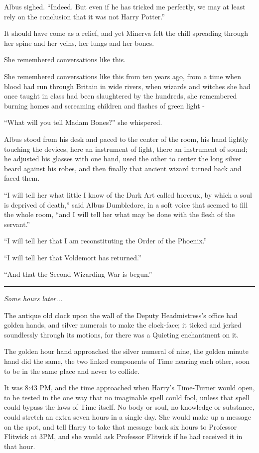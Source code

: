 Albus sighed. ``Indeed. But even if he has tricked me perfectly, we may at least rely on the conclusion that it was not Harry Potter.''

It should have come as a relief, and yet Minerva felt the chill spreading through her spine and her veins, her lungs and her bones.

She remembered conversations like this.

She remembered conversations like this from ten years ago, from a time when blood had run through Britain in wide rivers, when wizards and witches she had once taught in class had been slaughtered by the hundreds, she remembered burning homes and screaming children and flashes of green light -

``What will you tell Madam Bones?'' she whispered.

Albus stood from his desk and paced to the center of the room, his hand lightly touching the devices, here an instrument of light, there an instrument of sound; he adjusted his glasses with one hand, used the other to center the long silver beard against his robes, and then finally that ancient wizard turned back and faced them.

``I will tell her what little I know of the Dark Art called horcrux, by which a soul is deprived of death,'' said Albus Dumbledore, in a soft voice that seemed to fill the whole room, ``and I will tell her what may be done with the flesh of the servant.''

``I will tell her that I am reconstituting the Order of the Phoenix.''

``I will tell her that Voldemort has returned.''

``And that the Second Wizarding War is begun.''

\begin{center}\rule{3in}{0.4pt}\end{center}

\emph{Some hours later...}

The antique old clock upon the wall of the Deputy Headmistress's office had golden hands, and silver numerals to make the clock-face; it ticked and jerked soundlessly through its motions, for there was a Quieting enchantment on it.

The golden hour hand approached the silver numeral of nine, the golden minute hand did the same, the two linked components of Time nearing each other, soon to be in the same place and never to collide.

It was 8:43 PM, and the time approached when Harry's Time-Turner would open, to be tested in the one way that no imaginable spell could fool, unless that spell could bypass the laws of Time itself. No body or soul, no knowledge or substance, could stretch an extra seven hours in a single day. She would make up a message on the spot, and tell Harry to take that message back six hours to Professor Flitwick at 3PM, and she would ask Professor Flitwick if he had received it in that hour.

